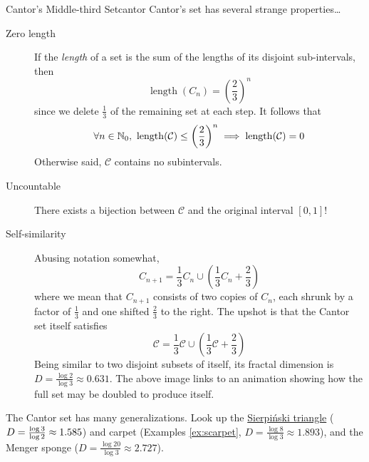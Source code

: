 \begin{example}{Cantor's Middle-third Set}{cantor}
	Cantor's set has several strange properties\ldots
	\begin{description}
	  \item[Zero length] If the \emph{length} of a set is the sum of the lengths of its disjoint sub-intervals, then
		\[
			\operatorname{length}(C_n)=\left(\frac 23\right)^n
		\]
		since we delete $\frac 13$ of the remaining set at each step. It follows that
	  \[
	  	\forall n\in\mathbb{N}_0,\ \operatorname{length}(\mathcal C)\le \left(\frac 23\right)^n \implies \operatorname{length}(\mathcal C)=0
	  \]
	  Otherwise said, $\mathcal C$ contains no subintervals.
	  \item[Uncountable] There exists a bijection between $\mathcal C$ and the original interval $[0,1]$!
	  \item[Self-similarity] Abusing notation somewhat,
		\[
			C_{n+1}=\frac 13C_n\cup\left(\frac 13C_n+\frac 23\right)
		\]
		where we mean that $C_{n+1}$ consists of two copies of $C_n$, each shrunk by a factor of $\frac 13$ and one shifted $\frac 23$ to the right. The upshot is that the Cantor set itself satisfies
		\[
			\mathcal C=\frac 13\mathcal C\cup\left(\frac 13\mathcal C+\frac 23\right)
		\]
		Being similar to two disjoint subsets of itself, its fractal dimension is $D=\frac{\log 2}{\log 3}\approx 0.631$. The above image links to an animation showing how the full set may be doubled to produce itself.
	\end{description}

	The Cantor set has many generalizations. Look up the \href{https://en.wikipedia.org/wiki/Sierpiński_triangle}{Sierpiński triangle} ($D=\smash{\frac{\log 3}{\log 2}}\approx 1.585$) and carpet (Examples \ref{ex:scarpet}, $D=\frac{\log 8}{\log 3}\approx 1.893$), and the Menger sponge ($D=\frac{\log 20}{\log 3}\approx 2.727$).
\end{example}


\goodbreak


